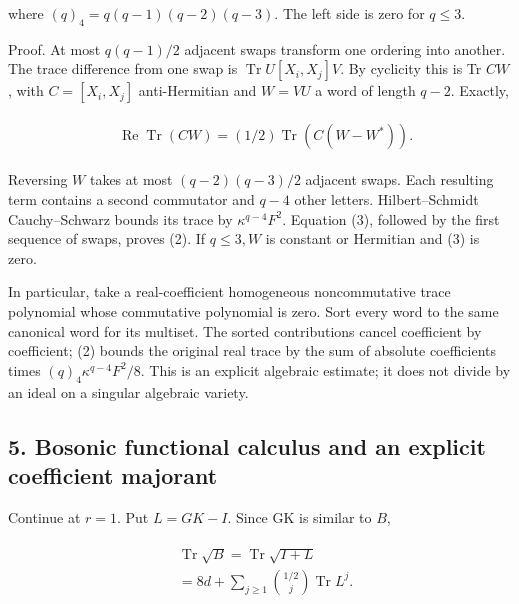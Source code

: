 where \((q)_{4}=q(q-1)(q-2)(q-3)\). The left side is zero for
\(q\le 3\).

Proof. At most \(q(q-1)/2\) adjacent swaps transform one ordering into
another. The trace difference from one swap is
\(\operatorname{Tr}  U[X_{i},X_{j}]V\). By cyclicity this is Tr \(C W\),
with \(C=[X_{i},X_{j}]\) anti-Hermitian and \(W=VU\) a word of length
\(q-2\). Exactly,

\begin{gather*}
\begin{aligned}
& \operatorname{Re}  \operatorname{Tr} (CW)=(1/2)\operatorname{Tr} (C(W-W^{*})).
\end{aligned}\tag{3}
\end{gather*}

Reversing \(W\) takes at most \((q-2)(q-3)/2\) adjacent swaps. Each
resulting term contains a second commutator and \(q-4\) other letters.
Hilbert--Schmidt Cauchy--Schwarz bounds its trace by
\(\kappa ^{q-4}F^{2}\). Equation (3), followed by the first sequence of
swaps, proves (2). If \(q\le 3, W\) is constant or Hermitian and (3) is
zero.

In particular, take a real-coefficient homogeneous noncommutative trace
polynomial whose commutative polynomial is zero. Sort every word to the
same canonical word for its multiset. The sorted contributions cancel
coefficient by coefficient; (2) bounds the original real trace by the
sum of absolute coefficients times \((q)_{4} \kappa ^{q-4}F^{2}/8\).
This is an explicit algebraic estimate; it does not divide by an ideal
on a singular algebraic variety.

\subsection{5. Bosonic functional calculus and an explicit coefficient
majorant}\label{b-bosonic-functional-calculus-and-an-explicit-coefficient-majorant}

Continue at \(r=1\). Put \(L=GK-I\). Since GK is similar to \(B\),

\begin{gather*}
\begin{aligned}
& \operatorname{Tr}  \sqrt{B}=\operatorname{Tr}  \sqrt{I+L} \\
& =8d+\sum _{j\ge 1} \binom{1/2}{j} \operatorname{Tr}  L^{j}.
\end{aligned}\tag{4}
\end{gather*}

